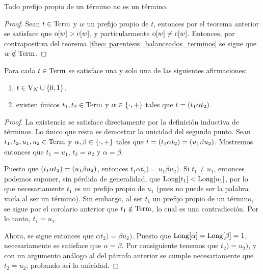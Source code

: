\begin{coll}
	Todo prefijo propio de un término no es un término.
\end{coll}

\begin{proof}
	Sean $t\in\TERMINOS$ y $w$ un prefijo propio de $t$, entonces por el teorema anterior se satisface que $\ABIERTO\bra*{w} >\CERRADO\bra*{w}$, y particularmente $\ABIERTO\bra*{w}\neq\CERRADO\bra*{w}$. Entonces, por contrapositiva del teorema \ref{theo: parentesis_balanceados_terminos} se sigue que $w\notin\TERMINOS$.
\end{proof}

\begin{theorem}
	Para cada $t\in\TERMINOS$ se satisface una y solo una de las siguientes afirmaciones:
	\begin{enumerate}
		\item $t\in\VARIABLES[N]\cup\set*{0, 1}$.
		\item existen únicos $t_{1}, t_{2}\in\TERMINOS$ y $\alpha\in\set*{\cdot, +}$ tales que $t =\pa*{t_{1}\alpha t_{2}}$.
	\end{enumerate}
\end{theorem}

\begin{proof}
	La existencia se satisface directamente por la definición inductiva de términos. Lo único que resta es demostrar la unicidad del segundo punto. Sean $t_{1}, t_{2}, u_{1}, u_{2}\in\TERMINOS$ y $\alpha,\beta\in\set*{\cdot, +}$ tales que $t =\pa*{t_{1}\alpha t_{2}} =\pa*{u_{1}\beta u_{2}}$. Mostremos entonces que $t_{1} = u_{1}$, $t_{2} = u_{2}$ y $\alpha =\beta$.

	Puesto que $\pa*{t_{1}\alpha t_{2}} =\pa*{u_{1}\beta u_{2}}$, entonces $t_{1}\alpha t_{2}) = u_{1}\beta u_{2})$. Si $t_{1}\neq u_{1}$, entonces podemos suponer, sin pérdida de generalidad, que $\LONGITUD\bra*{t_{1}} <\LONGITUD\bra*{u_{1}}$, por lo que necesariamente $t_{1}$ es un prefijo propio de $u_{1}$ (pues no puede ser la palabra vacía al ser un término). Sin embargo, al ser $t_{1}$ un prefijo propio de un término, se sigue por el corolario anterior que $t_{1}\notin\TERMINOS$, lo cual es una contradicción. Por lo tanto, $t_{1} = u_{1}$.

	Ahora, se sigue entonces que $\alpha t_{2}) =\beta u_{2})$. Puesto que $\LONGITUD\bra*{\alpha} =\LONGITUD\bra*{\beta} = 1$, necesariamente se satisface que $\alpha =\beta$. Por consiguiente tenemos que $t_{2}) = u_{2})$, y con un argumento análogo al del párrafo anterior se cumple necesariamente que $t_{2} = u_{2}$; probando así la unicidad.
\end{proof}

